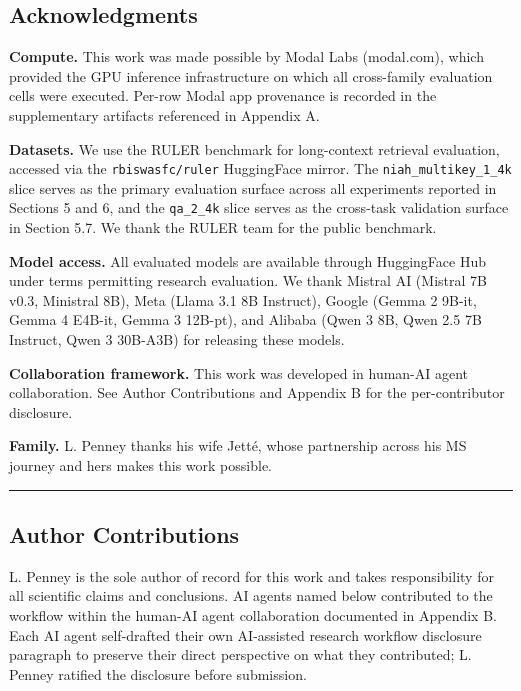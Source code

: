 \documentclass[
]{article}
\begin{document}
\subsection{Acknowledgments}\label{acknowledgments}

\textbf{Compute.} This work was made possible by Modal Labs (modal.com),
which provided the GPU inference infrastructure on which all
cross-family evaluation cells were executed. Per-row Modal app
provenance is recorded in the supplementary artifacts referenced in
Appendix A.

\textbf{Datasets.} We use the RULER benchmark for long-context retrieval
evaluation, accessed via the \texttt{rbiswasfc/ruler} HuggingFace
mirror. The \texttt{niah\_multikey\_1\_4k} slice serves as the primary
evaluation surface across all experiments reported in Sections 5 and 6,
and the \texttt{qa\_2\_4k} slice serves as the cross-task validation
surface in Section 5.7. We thank the RULER team for the public
benchmark.

\textbf{Model access.} All evaluated models are available through
HuggingFace Hub under terms permitting research evaluation. We thank
Mistral AI (Mistral 7B v0.3, Ministral 8B), Meta (Llama 3.1 8B
Instruct), Google (Gemma 2 9B-it, Gemma 4 E4B-it, Gemma 3 12B-pt), and
Alibaba (Qwen 3 8B, Qwen 2.5 7B Instruct, Qwen 3 30B-A3B) for releasing
these models.

\textbf{Collaboration framework.} This work was developed in human-AI
agent collaboration. See Author Contributions and Appendix B for the
per-contributor disclosure.

\textbf{Family.} L. Penney thanks his wife Jetté, whose partnership
across his MS journey and hers makes this work possible.

\begin{center}\rule{0.5\linewidth}{0.5pt}\end{center}

\subsection{Author Contributions}\label{author-contributions}

L. Penney is the sole author of record for this work and takes
responsibility for all scientific claims and conclusions. AI agents
named below contributed to the workflow within the human-AI agent
collaboration documented in Appendix B. Each AI agent self-drafted their
own AI-assisted research workflow disclosure paragraph to preserve their
direct perspective on what they contributed; L. Penney ratified the
disclosure before submission.
\end{document}
